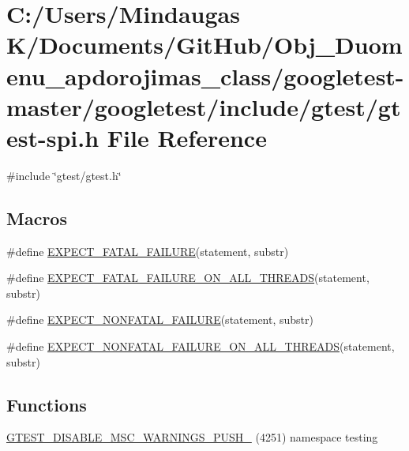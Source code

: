 \hypertarget{googletest-master_2googletest_2include_2gtest_2gtest-spi_8h}{}\section{C\+:/\+Users/\+Mindaugas K/\+Documents/\+Git\+Hub/\+Obj\+\_\+\+Duomenu\+\_\+apdorojimas\+\_\+class/googletest-\/master/googletest/include/gtest/gtest-\/spi.h File Reference}
\label{googletest-master_2googletest_2include_2gtest_2gtest-spi_8h}
{\ttfamily \#include \char`\"{}gtest/gtest.\+h\char`\"{}}\newline
\subsection*{Macros}
\begin{DoxyCompactItemize}
\item 
\#define \mbox{\hyperlink{googletest-master_2googletest_2include_2gtest_2gtest-spi_8h_a819a3fd7f8b8cf24b6f1b3a26708973d}{E\+X\+P\+E\+C\+T\+\_\+\+F\+A\+T\+A\+L\+\_\+\+F\+A\+I\+L\+U\+RE}}(statement,  substr)
\item 
\#define \mbox{\hyperlink{googletest-master_2googletest_2include_2gtest_2gtest-spi_8h_ad8aac5bc859b2ddc07583636ae4f45cf}{E\+X\+P\+E\+C\+T\+\_\+\+F\+A\+T\+A\+L\+\_\+\+F\+A\+I\+L\+U\+R\+E\+\_\+\+O\+N\+\_\+\+A\+L\+L\+\_\+\+T\+H\+R\+E\+A\+DS}}(statement,  substr)
\item 
\#define \mbox{\hyperlink{googletest-master_2googletest_2include_2gtest_2gtest-spi_8h_a8376fd6821bd88fd806697355e79e138}{E\+X\+P\+E\+C\+T\+\_\+\+N\+O\+N\+F\+A\+T\+A\+L\+\_\+\+F\+A\+I\+L\+U\+RE}}(statement,  substr)
\item 
\#define \mbox{\hyperlink{googletest-master_2googletest_2include_2gtest_2gtest-spi_8h_a9f4cf1f150fe9facfc4cbf0bae646ee9}{E\+X\+P\+E\+C\+T\+\_\+\+N\+O\+N\+F\+A\+T\+A\+L\+\_\+\+F\+A\+I\+L\+U\+R\+E\+\_\+\+O\+N\+\_\+\+A\+L\+L\+\_\+\+T\+H\+R\+E\+A\+DS}}(statement,  substr)
\end{DoxyCompactItemize}
\subsection*{Functions}
\begin{DoxyCompactItemize}
\item 
\mbox{\hyperlink{googletest-master_2googletest_2include_2gtest_2gtest-spi_8h_a88f79832f9d045112a76e9da8611cc13}{G\+T\+E\+S\+T\+\_\+\+D\+I\+S\+A\+B\+L\+E\+\_\+\+M\+S\+C\+\_\+\+W\+A\+R\+N\+I\+N\+G\+S\+\_\+\+P\+U\+S\+H\+\_\+}} (4251) namespace testing
\end{DoxyCompactItemize}


